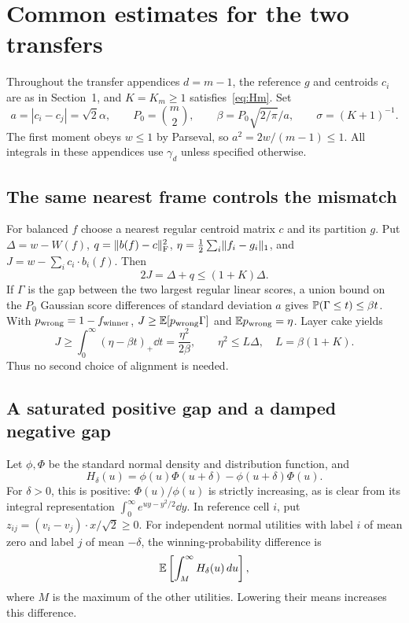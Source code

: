 \section{Common estimates for the two transfers}\label{app:common}
Throughout the transfer appendices $d=m-1$, the reference $g$ and centroids
$c_i$ are as in Section~1, and $K=K_m\geq1$ satisfies~\eqref{eq:Hm}.
Set
\[
 a=|c_i-c_j|=\sqrt2\alpha,\qquad
 P_0=\binom m2,\qquad
 \beta=P_0\sqrt{2/\pi}/a,\qquad \sigma=(K+1)^{-1}.
\]
The first moment obeys $w\leq1$ by Parseval, so
$a^2=2w/(m-1)\leq1$.
All integrals in these appendices use $\gamma_d$ unless specified otherwise.

\subsection{The same nearest frame controls the mismatch}
For balanced $f$ choose a nearest regular centroid matrix $c$ and its partition
$g$. Put $\Delta=w-W(f)$, $q=\lVert b(f)-c\rVert_{\mathrm F}^2$,
$\eta=\frac12\sum_i\lVert f_i-g_i\rVert_1$, and
$J=w-\sum_i c_i\cdot b_i(f)$.
Then
\begin{equation}\label{eq:linear-identity}
 2J=\Delta+q\leq(1+K)\Delta.
\end{equation}
If $\Gamma$ is the gap between the two largest regular linear scores, a union
bound on the $P_0$ Gaussian score differences of standard deviation $a$ gives
$\mathbb P(\Gamma\leq t)\leq\beta t$. With $p_{\rm wrong}=1-f_{\rm winner}$,
$J\geq\mathbb E[p_{\rm wrong}\Gamma]$ and $\mathbb E p_{\rm wrong}=\eta$.
Layer cake yields
\[
 J\geq\int_0^\infty(\eta-\beta t)_+\dd t
   =\frac{\eta^2}{2\beta},\qquad
 \eta^2\leq L\Delta,\quad L=\beta(1+K).
\]
Thus no second choice of alignment is needed.

\subsection{A saturated positive gap and a damped negative gap}
Let $\phi,\Phi$ be the standard normal density and distribution function, and
\[
 H_\delta(u)=\phi(u)\Phi(u+\delta)-\phi(u+\delta)\Phi(u).
\]
For $\delta>0$, this is positive: $\Phi(u)/\phi(u)$ is strictly increasing,
as is clear from its integral representation
$\int_0^\infty e^{uy-y^2/2}\dd y$.
In reference cell $i$, put $z_{ij}=(v_i-v_j)\cdot x/\sqrt2\geq0$.
For independent normal utilities with label $i$ of mean zero and label $j$
of mean $-\delta$, the winning-probability difference is
\[
 \mathbb E\left[\int_M^\infty H_\delta(u)\,d u\right],
\]
where $M$ is the maximum of the other utilities. Lowering their means
increases this difference.

